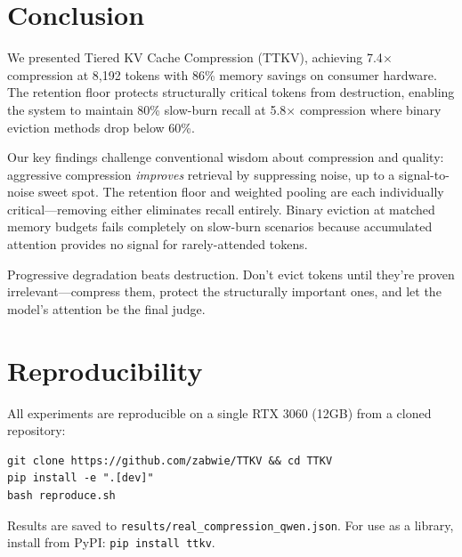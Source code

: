 \documentclass[11pt]{article}
\begin{document}
\section{Conclusion}

We presented Tiered KV Cache Compression (TTKV), achieving 7.4$\times$ compression at 8,192 tokens with 86\% memory savings on consumer hardware. The retention floor protects structurally critical tokens from destruction, enabling the system to maintain 80\% slow-burn recall at 5.8$\times$ compression where binary eviction methods drop below 60\%.

Our key findings challenge conventional wisdom about compression and quality: aggressive compression \textit{improves} retrieval by suppressing noise, up to a signal-to-noise sweet spot. The retention floor and weighted pooling are each individually critical---removing either eliminates recall entirely. Binary eviction at matched memory budgets fails completely on slow-burn scenarios because accumulated attention provides no signal for rarely-attended tokens.

Progressive degradation beats destruction. Don't evict tokens until they're proven irrelevant---compress them, protect the structurally important ones, and let the model's attention be the final judge.

\section*{Reproducibility}

All experiments are reproducible on a single RTX 3060 (12GB) from a cloned repository:

\begin{verbatim}
git clone https://github.com/zabwie/TTKV && cd TTKV
pip install -e ".[dev]"
bash reproduce.sh
\end{verbatim}

Results are saved to \texttt{results/real\_compression\_qwen.json}. For use as a library, install from PyPI: \texttt{pip install ttkv}.
\end{document}
